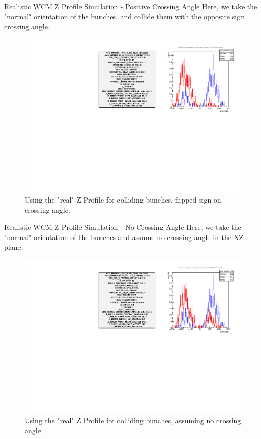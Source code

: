 \begin{frame}{Realistic WCM Z Profile Simulation - Positive Crossing Angle}
Here, we take the "normal" orientation of the bunches, and collide them with the
opposite sign crossing angle.
\begin{figure}
\begin{center}
\includegraphics[width=0.75\linewidth]{../ZBunchInSimulation/figs/real_wcm_prof_zvertex_compare_hscan_pos_1000_359711_pos_xing.pdf}
\end{center}
\caption{ Using the "real" Z Profile for colliding bunches, flipped sign on
	crossing angle.}
\label{fig:real_wcm_prof_zvertex_compare_hscan_pos_1000_359711_pos_xing}
\end{figure}
\end{frame}

\begin{frame}{Realistic WCM Z Profile Simulation - No Crossing Angle}
Here, we take the "normal" orientation of the bunches and assume no crossing
angle in the XZ plane.
\begin{figure}
\begin{center}
\includegraphics[width=0.75\linewidth]{../ZBunchInSimulation/figs/real_wcm_prof_zvertex_compare_hscan_pos_1000_359711_zero_xing.pdf}
\end{center}
\caption{ Using the "real" Z Profile for colliding bunches, assuming no crossing
angle}
\label{fig:real_wcm_prof_zvertex_compare_hscan_pos_1000_359711_zero_xing}
\end{figure}
\end{frame}

